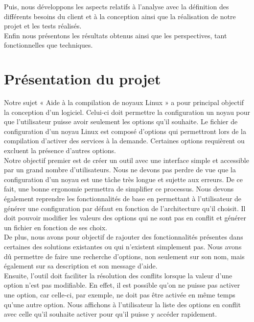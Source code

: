 \documentclass[17pts]{report}
\begin{document}
Puis, nous développons les aspects relatifs à l’analyse avec la définition des
différents besoins du client et à la conception ainsi que la réalisation de
notre projet et les tests réalisés.  \\

Enfin nous présentons les résultats obtenus ainsi que les perspectives, tant
fonctionnelles que techniques.
\clearpage

\chapter{Présentation du projet}\thispagestyle{IHA-fancy-style}
\label{cha:Présentation du projet}
Notre sujet « Aide à la compilation de noyaux Linux » a pour principal objectif
la conception d'un logiciel. Celui-ci doit permettre la configuration un noyau
pour que l'utilisateur puisse avoir seulement les options qu'il souhaite.  Le
fichier de configuration d'un noyau Linux est composé d'options qui permettront
lors de la compilation d'activer des services à la demande.  Certaines options
requièrent ou excluent la présence d'autres options.  \\

Notre objectif premier est de créer un outil avec une interface simple et
accessible par un grand nombre d'utilisateurs. Nous ne devons pas perdre de vue
que la configuration d'un noyau est une tâche très longue et sujette aux
erreurs. De ce fait, une bonne ergonomie permettra de simplifier ce processus.
Nous devons également reprendre les fonctionnalités de base en permettant à
l'utilisateur de générer une configuration par défaut en fonction de
l'architecture qu'il choisit. Il doit pouvoir modifier les valeurs des options
qui ne sont pas en conflit et générer un fichier en fonction de ses choix.  \\

De plus, nous avons pour objectif de rajouter des fonctionnalités présentes
dans certaines des solutions existantes ou qui n'existent simplement pas.  Nous
avons dû permettre de faire une recherche d'options, non seulement sur son nom,
mais également sur sa description et son message d'aide.  \\

Ensuite, l'outil doit faciliter la résolution des conflits lorsque la valeur
d'une option n'est pas modifiable. En effet, il est possible qu'on ne puisse
pas activer une option, car celle-ci, par exemple, ne doit pas être activée en
même temps qu'une autre option. Nous affichons à l'utilisateur la liste des
options en conflit avec celle qu'il souhaite activer pour qu'il puisse y
accéder rapidement.  \\
\end{document}
